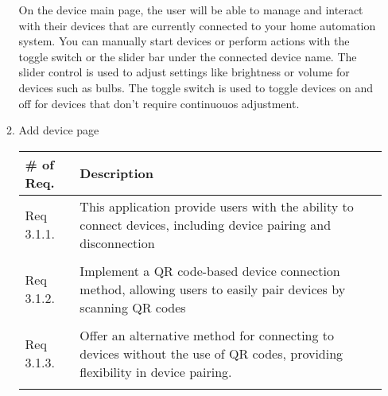 \begin{enumerate}[label=\arabic*.]
\begin{enumerate}[label*={\arabic*.},ref=\theenumi.\arabic*]

                    On the device main page, the user will be able to manage and interact with their devices that are currently connected to your home automation system. You can manually start devices or perform actions with the toggle switch or the slider bar under the connected device name. The slider control is used to adjust settings like brightness or volume for devices such as bulbs. The toggle switch is used to toggle devices on and off for devices that don't require continuouos adjustment.  \\
              \item Add device page
                    \begin{table}[H]
                        \center
                        \begin{tabular}{m{1.4cm} m{5.5cm}}
                            \toprule
                            \# of Req. & Description                                                                                                                 \\
                            \midrule
                            Req 3.1.1. & This application provide users with the ability to connect devices, including device pairing and disconnection              \\\\
                            Req 3.1.2. & Implement a QR code-based device connection method, allowing users to easily pair devices by scanning QR codes              \\\\
                            Req 3.1.3. & Offer an alternative method for connecting to devices without the use of QR codes, providing flexibility in device pairing. \\\\
                            \bottomrule
                        \end{tabular}
                    \end{table}


\end{enumerate}
\end{enumerate}
